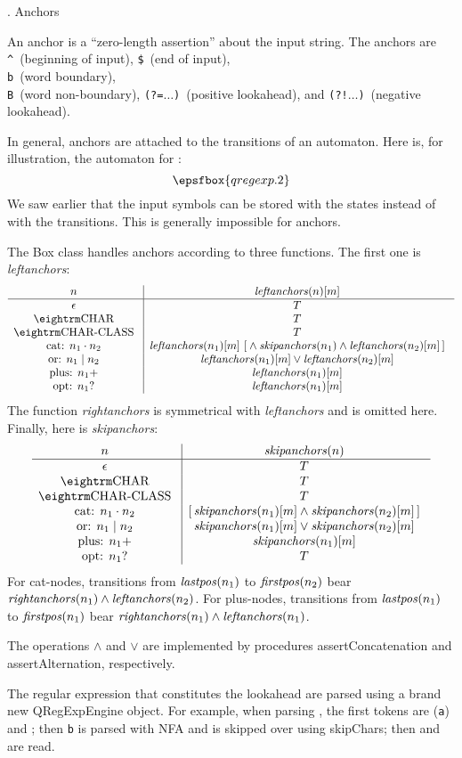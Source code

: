 . Anchors

An anchor is a ``zero-length assertion'' about the input string.  The anchors are {\tt\^}~(beginning of input), {\tt\$}~(end of input), {\tt\\b}~(word boundary), {\tt\\B}~(word non-boundary), {\tt(?=}$\ldots${\tt)}~(positive lookahead), and {\tt(?!}$\ldots${\tt)}~(negative lookahead).

In general, anchors are attached to the transitions of an automaton.  Here is, for illustration, the automaton for :  $$\epsfbox{qregexp.2}$$  We saw earlier that the input symbols can be stored with the states instead of with the transitions.  This is generally impossible for anchors.

The {\sf Box} class handles anchors according to three functions.  The first one is {\it leftanchors\/}:  $$\vbox{\halign{\g{#}\vrule && \g{$#$} \cr
  $n$                   & {\it leftanchors}(n)[m] \cr
\noalign{\hrule}
  $\epsilon$            & T \cr
  \tok{char}            & T \cr
  \tok{char-class}      & T \cr
  cat: $n_1 \cdot n_2$  & {\it leftanchors}(n_1)[m] \ [{} \land {\it skipanchors}(n_1) \land {\it leftanchors}(n_2)[m]\,] \cr
  or: $n_1 \mid n_2$    & {\it leftanchors}(n_1)[m] \lor {\it leftanchors}(n_2)[m] \cr
  plus: $n_1+$          & {\it leftanchors}(n_1)[m] \cr
  opt: $n_1?$           & {\it leftanchors}(n_1)[m] \cr
}}$$  The function {\it rightanchors\/} is symmetrical with {\it leftanchors} and is omitted here.  Finally, here is {\it skipanchors\/}:  $$\vbox{\halign{\g{#}\vrule && \g{$#$} \cr
  $n$                   & {\it skipanchors}(n) \cr
\noalign{\hrule}
  $\epsilon$            & T \cr
  \tok{char}            & T \cr
  \tok{char-class}      & T \cr
  cat: $n_1 \cdot n_2$  & [\,{\it skipanchors}(n_1)[m] \land {\it skipanchors}(n_2)[m]\,] \cr
  or: $n_1 \mid n_2$    & {\it skipanchors}(n_1)[m] \lor {\it skipanchors}(n_2)[m] \cr
  plus: $n_1+$          & {\it skipanchors}(n_1)[m] \cr
  opt: $n_1?$           & T \cr
}}$$  For cat-nodes, transitions from ${\it lastpos}(n_1)$ to ${\it firstpos}(n_2)$ bear ${\it rightanchors}(n_1) \land {\it leftanchors}(n_2)$.  For plus-nodes, transitions from ${\it lastpos}(n_1)$ to ${\it firstpos}(n_1)$ bear ${\it rightanchors}(n_1) \land {\it leftanchors}(n_1)$.

The operations $\land$ and $\lor$ are implemented by procedures {\sf assertConcatenation} and {\sf assertAlternation}, respectively.

The regular expression that constitutes the lookahead are parsed using a brand new {\sf QRegExpEngine} object.  For example, when parsing , the first tokens are  ({\tt a}) and ; then {\tt b} is parsed with NFA and is skipped over using {\sf skipChars}; then \lex{)} and  are read.

